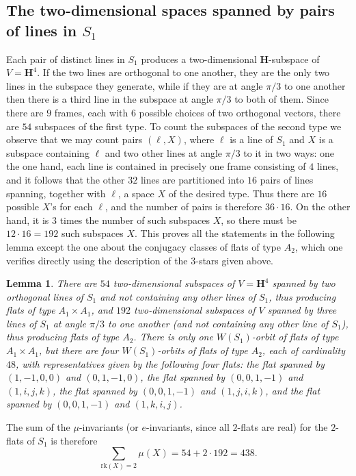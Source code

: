\documentclass[11pt, reqno]{amsart}
\numberwithin{equation}{section}
\theoremstyle{definition}
\theoremstyle{plain}
\newtheorem{lemma}[theorem]{Lemma}
\newcommand{\HH}{\mathbf{H}}
\begin{document}
\subsection{The two-dimensional spaces spanned by pairs of lines in $S_1$} Each pair of distinct lines in $S_1$ produces a two-dimensional $\HH$-subspace of $V=\HH^4$. If the two lines are orthogonal to one another, they are the only two lines in the subspace they generate, while if they are at angle $\pi/3$ to one another then there is a third line in the subspace at angle $\pi/3$ to both of them. Since there are $9$ frames, each with $6$ possible choices of two orthogonal vectors, there are $54$ subspaces of the first type. To count the subspaces of the second type we observe that we may count pairs $(\ell,X)$, where $\ell$ is a line of $S_1$ and $X$ is a subspace containing $\ell$ and two other lines at angle $\pi/3$ to it in two ways: one the one hand, each line is contained in precisely one frame consisting of $4$ lines, and it follows that the other $32$ lines are partitioned into $16$ pairs of lines spanning, together with $\ell$, a space $X$ of the desired type. Thus there are $16$ possible $X$'s for each $\ell$, and the number of pairs is therefore $36 \cdot 16$. On the other hand, it is $3$ times the number of such subspaces $X$, so there must be $12 \cdot 16=192$ such subspaces $X$. This proves all the statements in the following lemma except the one about the conjugacy classes of flats of type $A_2$, which one verifies directly using the description of the $3$-stars given above.
\begin{lemma}
There are $54$ two-dimensional subspaces of $V=\HH^4$ spanned by two orthogonal lines of $S_1$ and not containing any other lines of $S_1$, thus producing flats of type $A_1 \times A_1$, and $192$ two-dimensional subspaces of $V$ spanned by three lines of $S_1$ at angle $\pi/3$ to one another (and not containing any other line of $S_1$), thus producing flats of type $A_2$. There is only one $W(S_1)$-orbit of flats of type $A_1 \times A_1$, but there are four $W(S_1)$-orbits of flats of type $A_2$, each of cardinality $48$, with representatives given by the following four flats: the flat spanned by $(1,-1,0,0)$ and $(0,1,-1,0)$, the flat spanned by $(0,0,1,-1)$ and $(1,i,j,k)$, the flat spanned by $(0,0,1,-1)$ and $(1,j,i,k)$, and the flat spanned by $(0,0,1,-1)$ and $(1,k,i,j)$. 
\end{lemma}

The sum of the $\mu$-invariants (or $e$-invariants, since all $2$-flats are real) for the $2$-flats of $S_1$ is therefore
$$\sum_{\mathrm{rk}(X)=2} \mu(X)=54+2 \cdot 192=438.$$
\end{document}
